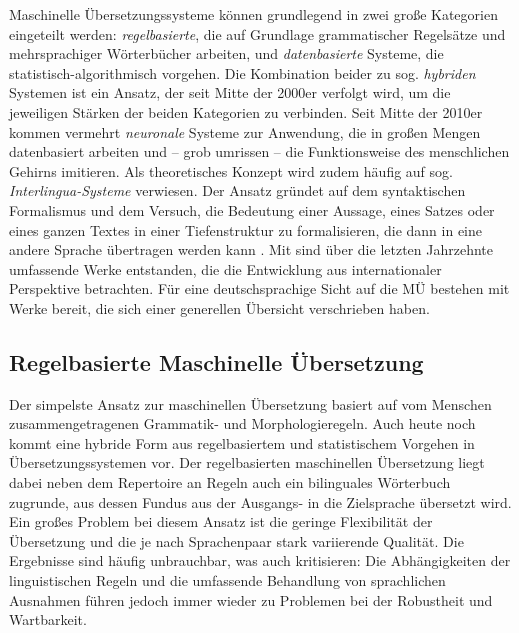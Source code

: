\label{K3:sec:MUE}


Maschinelle Übersetzungssysteme können grundlegend in zwei große Kategorien eingeteilt werden: \emph{regelbasierte}, die auf Grundlage grammatischer Regelsätze und mehrsprachiger Wörterbücher arbeiten, und \emph{datenbasierte} Systeme, die statistisch-algorithmisch vorgehen. Die Kombination beider zu sog. \emph{hybriden} Systemen ist ein Ansatz, der seit Mitte der 2000er verfolgt wird, um die jeweiligen Stärken der beiden Kategorien zu verbinden. Seit Mitte der 2010er kommen vermehrt \emph{neuronale} Systeme zur Anwendung, die in großen Mengen datenbasiert arbeiten und -- grob umrissen -- die Funktionsweise des menschlichen Gehirns imitieren. Als theoretisches Konzept wird zudem häufig auf sog. \emph{Interlingua-Systeme} verwiesen. Der Ansatz gründet auf dem syntaktischen Formalismus und dem Versuch, die Bedeutung einer Aussage, eines Satzes oder eines ganzen Textes in einer Tiefenstruktur zu formalisieren, die dann in eine andere Sprache übertragen werden kann \citep[16\psq]{koehn_statistical_2009}.
Mit \citet{hutchins_introduction_1997, wilks_machine_2009, koehn_statistical_2009, koehn_neural_2020} sind über die letzten Jahrzehnte umfassende Werke entstanden, die die Entwicklung aus internationaler Perspektive betrachten. Für eine deutschsprachige Sicht auf die MÜ bestehen mit \citet{laisiepen_grundlagen_1996, ramlow_maschinelle_2009, stein_machine_2013,  porsiel_maschinelle_2017} Werke bereit, die sich einer generellen Übersicht verschrieben haben.




\subsection{Regelbasierte Maschinelle Übersetzung}

\label{K3:subsec:RBMT}

\begin{sloppypar}
Der simpelste Ansatz zur maschinellen Übersetzung basiert auf vom Menschen zusammengetragenen Grammatik- und Morphologieregeln. Auch heute noch kommt eine hybride Form aus regelbasiertem und statistischem Vorgehen in Übersetzungssystemen vor. Der regelbasierten maschinellen Übersetzung liegt dabei neben dem Repertoire an Regeln auch ein bilinguales Wörterbuch zugrunde, aus dessen Fundus aus der Ausgangs- in die Zielsprache übersetzt wird. Ein großes Problem bei diesem Ansatz ist die geringe Flexibilität der Übersetzung und die je nach Sprachenpaar stark variierende Qualität. Die Ergebnisse sind häufig unbrauchbar, was auch \citet[647]{carstensen_computerlinguistik_2010} kritisieren: \glqq Die Abhängigkeiten der linguistischen Regeln und die umfassende Behandlung von sprachlichen Ausnahmen führen jedoch immer wieder zu Problemen bei der Robustheit und Wartbarkeit.\grqq{}\end{sloppypar}

